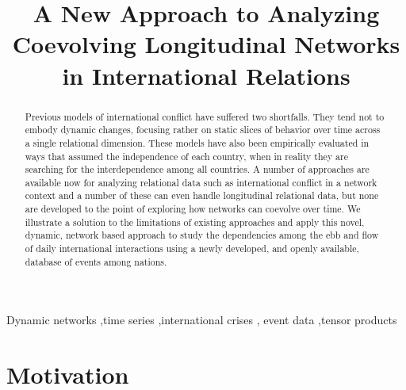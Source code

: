 \documentclass[3p,times,twocolumn,authoryear,12pt]{elsarticle}
\begin{document}
\begin{frontmatter}

\title{A New Approach to Analyzing Coevolving Longitudinal Networks in International Relations}




\begin{abstract}
Previous models of international conflict have suffered two shortfalls. They tend not to embody dynamic changes, focusing rather on static slices of behavior over time across a single relational dimension. These models have also been empirically evaluated in ways that assumed the independence of each country, when in reality they are searching for the interdependence among all countries. A number of approaches are available now for analyzing relational data such as international conflict in a network context and a number of these can even handle longitudinal relational data, but none are developed to the point of exploring how networks can coevolve over time. We illustrate a solution to the limitations of existing approaches and apply this novel, dynamic, network based approach to study the dependencies among the ebb and flow of daily international interactions using a newly developed, and openly available, database of events among nations. 

\end{abstract}

\begin{keyword}
Dynamic networks \sep time series \sep international crises \sep 
event data \sep tensor products
\end{keyword}

\end{frontmatter}

\section{Motivation}
\end{document}
